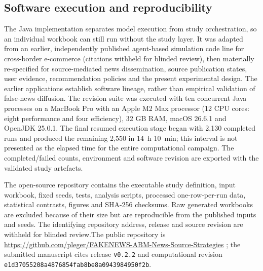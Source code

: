 \subsection{Software execution and reproducibility}

The Java implementation separates model execution from study orchestration, so an individual workbook can still run without the study layer. It was adapted from an earlier, independently published agent-based simulation code line for cross-border e-commerce \ifdefined\ANONYMOUS (citations withheld for blinded review)\else\citep{teranAl:jos2022,teranAl:tpc2025}\fi, then materially re-specified for source-mediated news dissemination, source publication states, user evidence, recommendation policies and the present experimental design. The earlier applications establish software lineage, rather than empirical validation of false-news diffusion. The revision suite was executed with ten concurrent Java processes on a MacBook Pro with an Apple M2 Max processor (12 CPU cores: eight performance and four efficiency), 32 GB RAM, macOS 26.6.1 and OpenJDK 25.0.1. The final resumed execution stage began with 2,130 completed runs and produced the remaining 2,550 in 14~h 10~min; this interval is not presented as the elapsed time for the entire computational campaign. The completed/failed counts, environment and software revision are exported with the validated study artefacts.

The open-source repository contains the executable study definition, input workbook, fixed seeds, tests, analysis scripts, processed one-row-per-run data, statistical contrasts, figures and SHA-256 checksums. Raw generated workbooks are excluded because of their size but are reproducible from the published inputs and seeds. \ifdefined\ANONYMOUS The identifying repository address, release and source revision are withheld for blinded review.\else The public repository is \url{https://github.com/pleger/FAKENEWS-ABM-News-Source-Strategies} \citep{fakenewsRepository2026}; the submitted manuscript cites release \texttt{v0.2.2} and computational revision \texttt{e1d37055208a4876854fab8be8a0943984950f2b}.\fi{}
